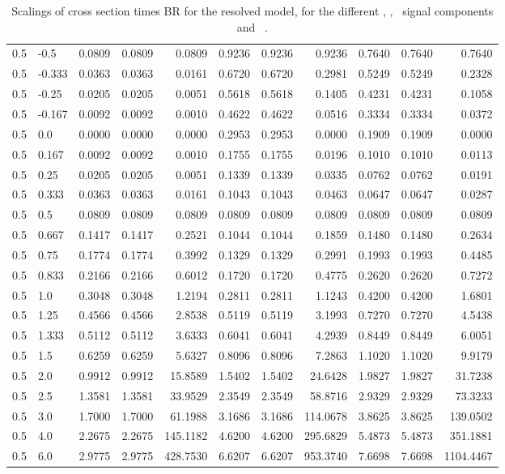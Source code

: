 \begin{table}[h!]
\begin{tabular}{ll rrr rrr rrr}
   0.5 & -0.5   & 0.0809 & 0.0809 & 0.0809   & 0.9236 & 0.9236 & 0.9236 & 0.7640 & 0.7640 & 0.7640 \\
   0.5 & -0.333 & 0.0363 & 0.0363 & 0.0161   & 0.6720 & 0.6720 & 0.2981 & 0.5249 & 0.5249 & 0.2328 \\
   0.5 & -0.25  & 0.0205 & 0.0205 & 0.0051   & 0.5618 & 0.5618 & 0.1405 & 0.4231 & 0.4231 & 0.1058 \\
   0.5 & -0.167 & 0.0092 & 0.0092 & 0.0010   & 0.4622 & 0.4622 & 0.0516 & 0.3334 & 0.3334 & 0.0372 \\
   0.5 & 0.0    & 0.0000 & 0.0000 & 0.0000   & 0.2953 & 0.2953 & 0.0000 & 0.1909 & 0.1909 & 0.0000 \\
   0.5 & 0.167  & 0.0092 & 0.0092 & 0.0010   & 0.1755 & 0.1755 & 0.0196 & 0.1010 & 0.1010 & 0.0113 \\
   0.5 & 0.25   & 0.0205 & 0.0205 & 0.0051   & 0.1339 & 0.1339 & 0.0335 & 0.0762 & 0.0762 & 0.0191 \\
   0.5 & 0.333  & 0.0363 & 0.0363 & 0.0161   & 0.1043 & 0.1043 & 0.0463 & 0.0647 & 0.0647 & 0.0287 \\
   0.5 & 0.5    & 0.0809 & 0.0809 & 0.0809   & 0.0809 & 0.0809 & 0.0809 & 0.0809 & 0.0809 & 0.0809 \\
   0.5 & 0.667  & 0.1417 & 0.1417 & 0.2521   & 0.1044 & 0.1044 & 0.1859 & 0.1480 & 0.1480 & 0.2634 \\
   0.5 & 0.75   & 0.1774 & 0.1774 & 0.3992   & 0.1329 & 0.1329 & 0.2991 & 0.1993 & 0.1993 & 0.4485 \\
   0.5 & 0.833  & 0.2166 & 0.2166 & 0.6012   & 0.1720 & 0.1720 & 0.4775 & 0.2620 & 0.2620 & 0.7272 \\
   0.5 & 1.0    & 0.3048 & 0.3048 & 1.2194   & 0.2811 & 0.2811 & 1.1243 & 0.4200 & 0.4200 & 1.6801 \\
   0.5 & 1.25   & 0.4566 & 0.4566 & 2.8538   & 0.5119 & 0.5119 & 3.1993 & 0.7270 & 0.7270 & 4.5438 \\
   0.5 & 1.333  & 0.5112 & 0.5112 & 3.6333   & 0.6041 & 0.6041 & 4.2939 & 0.8449 & 0.8449 & 6.0051 \\
   0.5 & 1.5    & 0.6259 & 0.6259 & 5.6327   & 0.8096 & 0.8096 & 7.2863 & 1.1020 & 1.1020 & 9.9179 \\
   0.5 & 2.0    & 0.9912 & 0.9912 & 15.8589  & 1.5402 & 1.5402 & 24.6428 & 1.9827 & 1.9827 & 31.7238 \\
   0.5 & 2.5    & 1.3581 & 1.3581 & 33.9529  & 2.3549 & 2.3549 & 58.8716 & 2.9329 & 2.9329 & 73.3233 \\
   0.5 & 3.0    & 1.7000 & 1.7000 & 61.1988  & 3.1686 & 3.1686 & 114.0678 & 3.8625 & 3.8625 & 139.0502 \\
   0.5 & 4.0    & 2.2675 & 2.2675 & 145.1182 & 4.6200 & 4.6200 & 295.6829 & 5.4873 & 5.4873 & 351.1881 \\
   0.5 & 6.0    & 2.9775 & 2.9775 & 428.7530 & 6.6207 & 6.6207 & 953.3740 & 7.6698 & 7.6698 & 1104.4467 \\\hline
  \end{tabular}
  \caption{Scalings of cross section times BR for the resolved model, for the different \ttH, \tHq, \tHW\ signal components and \ .}\label{tab:xsbrscalingK6_0p5}
\end{table}

